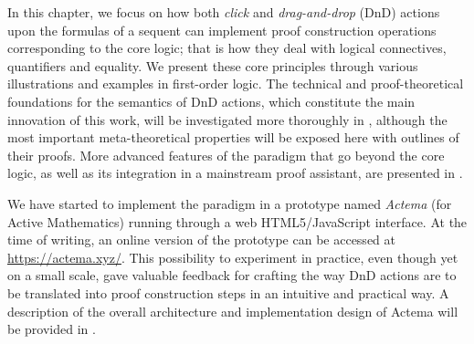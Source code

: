 


In this chapter, we focus on how both \emph{click} and \emph{drag-and-drop}
(DnD) actions upon the formulas of a sequent can implement proof construction
operations corresponding to the core logic; that is how they deal with logical
connectives, quantifiers and equality. We present these core principles through
various illustrations and examples in first-order logic. The technical and
proof-theoretical foundations for the semantics of DnD actions, which constitute
the main innovation of this work, will be investigated more thoroughly in
, although the most important meta-theoretical properties will be
exposed here with outlines of their proofs. More advanced features of the
paradigm that go beyond the core logic, as well as its integration in a
mainstream proof assistant, are presented in .

We have started to implement the paradigm in a prototype named {\em Actema} (for
Active Mathematics) running through a web HTML5/JavaScript interface. At the
time of writing, an online version of the prototype can be accessed at
\url{https://actema.xyz/}. This possibility to experiment in
practice, even though yet on a small scale, gave valuable feedback for crafting
the way DnD actions are to be translated into proof construction steps in an
intuitive and practical way. A description of the overall architecture and
implementation design of Actema will be provided in .

